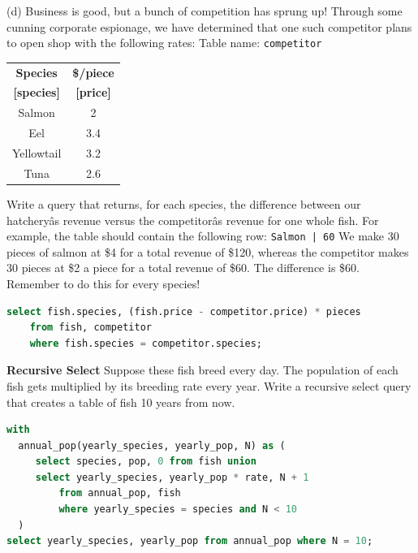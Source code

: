 \documentclass{exam}
\begin{document}
\begin{questions}
\begin{blocksection}
\vspace{10px}
(d) Business is good, but a bunch of competition has sprung up! Through some cunning corporate espionage, we have determined that one such competitor plans to open shop with the following rates:\newline
\newline
Table name: \texttt{competitor}
\begin{center}
\begin{tabular}{ |c|c| }
 \hline
 \textbf{Species} & \textbf{\$/piece} \\
  \textbf{[species]} & \textbf{[price]} \\
 \hline
 Salmon & 2 \\
 \hline
 Eel & 3.4 \\
 \hline
  Yellowtail & 3.2  \\
 \hline
 Tuna & 2.6  \\
 \hline
\end{tabular}
\end{center}
Write a query that returns, for each species, the difference between our hatcheryâs revenue versus the competitorâs revenue for one whole fish. For example, the table should contain the following row: \newline
\texttt{Salmon | 60} \newline \newline
We make 30 pieces of salmon at \$4 for a total revenue of \$120, whereas the competitor makes 30 pieces at \$2 a piece for a total revenue of \$60. The difference is \$60. Remember to do this for every species!
\begin{solution}[1in]
\begin{lstlisting}[language=SQL]
select fish.species, (fish.price - competitor.price) * pieces
    from fish, competitor
    where fish.species = competitor.species;
\end{lstlisting}
\end{solution}


\end{blocksection}

\question \textbf{Recursive Select} Suppose these fish breed every day. The population of each fish gets multiplied by its breeding rate every year. Write a recursive select query that creates a table of fish 10 years from now.

\begin{solution}[0.5in]
\begin{lstlisting}[language=SQL]
with
  annual_pop(yearly_species, yearly_pop, N) as (
     select species, pop, 0 from fish union
     select yearly_species, yearly_pop * rate, N + 1
         from annual_pop, fish
         where yearly_species = species and N < 10
  )
select yearly_species, yearly_pop from annual_pop where N = 10;

\end{lstlisting}
\end{solution}


\end{questions}
\end{document}
